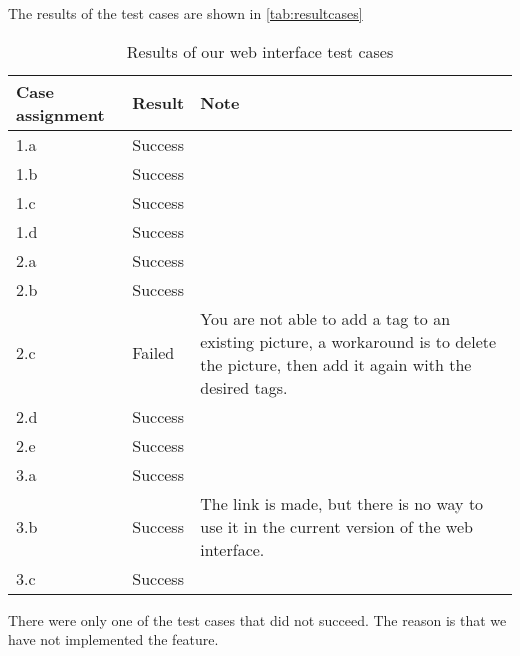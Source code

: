 The results of the test cases are shown in \autoref{tab:resultcases}

\begin{table}[H]
	\centering
	\begin{tabular}{|l|l|p{7cm}|}
		\hline
		Case assignment & Result & Note \\ \hline \hline
		1.a & Success & \\ \hline
		1.b & Success &\\ \hline
		1.c & Success&\\ \hline
		1.d & Success &\\ \hline
		2.a & Success &\\ \hline
		2.b & Success &\\ \hline
		2.c & Failed & You are not able to add a tag to an existing picture, a workaround is to delete the picture, then add it again with the desired tags.\\ \hline
		2.d & Success &\\ \hline
		2.e & Success &\\ \hline
		3.a & Success &\\ \hline
		3.b & Success & The link is made, but there is no way to use it in the current version of the web interface.\\ \hline
		3.c & Success &\\ \hline
	\end{tabular}
	\caption{Results of our web interface test cases}
	\label{tab:resultcases}
\end{table}

There were only one of the test cases that did not succeed. The reason is that we have not implemented the feature.